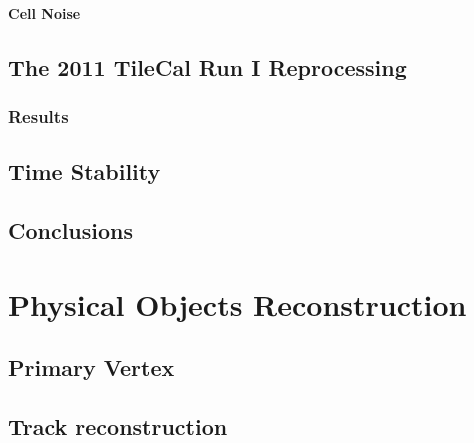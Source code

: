 \documentclass[10pt,twoside,cucitura,classica,english,openany]{toptesi}
\begin{document}
\subsubsection{Cell Noise}
\label{sec:cell-noise}



\section{The 2011 TileCal Run I Reprocessing}
\label{sec:2011-tilecal-run}



\subsection{Results}
\label{sec:results-1}



\section{Time Stability}
\label{sec:time-stability}



\section{Conclusions}
\label{sec:conclusions}



\chapter{Physical Objects Reconstruction}
\label{cha:phys-objects-reconst}



\section{Primary Vertex}
\label{sec:primary-vertex}



\section{Track reconstruction}
\label{sec:track-reconstruction}


\end{document}
